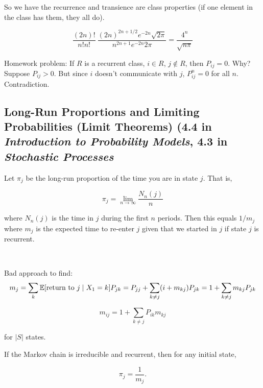 So we have the recurrence and transience are class properties (if one element in the class has them, they all do). 

\begin{example}

\[
\frac{(2n)!}{n!n!} ~ \frac{(2n)^{2n+1/2} e^{-2n} \sqrt{2 \pi}}{n^{2n+1} e^{-2n} 2 \pi} = \frac{4^n}{\sqrt{n \pi}}
\]

\end{example}

Homework problem: If \(R\) is a recurrent class, \(i \in R\), \(j \notin R\), then \(P_{ij}=0\). Why? Suppose \(P_{ij}>0\). But since \(i\) doesn't communicate with \(j\), \(P_{ij}^n=0\) for all \(n\). Contradiction. 

\subsection{Long-Run Proportions and Limiting Probabilities (Limit Theorems) (4.4 in \textit{Introduction to Probability Models}, 4.3 in \textit{Stochastic Processes}}

Let \(\pi_j\) be the long-run proportion of the time you are in state \(j\). That is,

\[
\pi_j = \lim_{n \to \infty} \frac{N_n(j)}{n} 
\]

where \(N_n(j)\) is the time in \(j\) during the first \(n\) periods. Then this equals \(1/m_j\) where \(m_j\) is the expected time to re-enter \(j\) given that we started in \(j\) if state \(j\) is recurrent.

\

Bad approach to find:
\[
m_j = \sum_k \mathbb{E} [\text{return to } j \mid X_1 = k] P_{jk} = P_{jj} + \sum_{k \neq j} (i + m_{kj}) P_{jk} = 1 + \sum_{k \neq j} m_{kj} P_{jk}
\]

\[
m_{ij} = 1 + \sum_{k \neq j} P_{ik} m_{kj} 
\]

for \(|S|\) states.

\begin{proposition}

If the Markov chain is irreducible and recurrent, then for any initial state,

\[
\pi_j =\frac{1}{m_j}.
\]

\end{proposition}

\begin{proposition}



\end{proposition}

